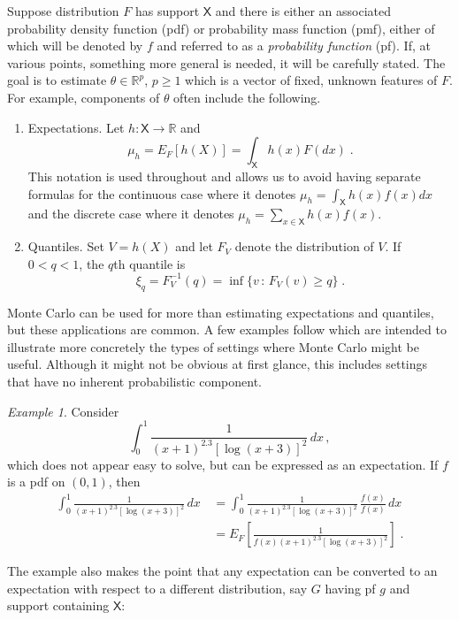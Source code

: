 \documentclass[12pt]{article}
\theoremstyle{plain}
\theoremstyle{definition}
\theoremstyle{remark}
\newtheorem{example}{Example}[section]
\newcommand{\sX}{\mathsf{X}}
\newcommand{\real}{\mathbb{R}}
\begin{document}
Suppose distribution $F$ has support $\sX$ and there is either an
associated probability density function (pdf) or probability mass
function (pmf), either of which will be denoted by $f$ and referred to
as a \textit{probability function} (pf).  If, at various points,
something more general is needed, it will be carefully stated.  The
goal is to estimate $\theta \in \mathbb{R}^p$, $p \ge 1$ which is a
vector of fixed, unknown features of $F$.  For example, components of
$\theta$ often include the following.
\begin{enumerate}
\item Expectations.  Let $h : \sX \to \real$ and 
\[
\mu_h = E_{F}[h(X)] = \int_{\sX} h(x) F(dx) \; .
\]
This notation is used throughout and allows us to avoid having
separate formulas for the continuous case where it denotes $\mu_{h} =
\int_{\sX} h(x) f(x) dx$ and the discrete case where it denotes
$\mu_{h} = \sum_{x \in \sX} h(x) f(x)$.

\item Quantiles.  Set $V=h(X)$ and let $F_V$ denote the distribution
  of $V$.  If $0 < q < 1$, the $q$th quantile is
\[
\xi_{q} = F_{V}^{-1}(q) = \inf \{ v \, : \, F_{V}(v) \ge q\} \; .
\]

\end{enumerate}
Monte Carlo can be used for more than estimating expectations and
quantiles, but these applications are common.  A few examples follow
which are intended to illustrate more concretely the types of
settings where Monte Carlo might be useful.  Although it might not be
obvious at first glance, this includes settings that have no inherent
probabilistic component.

\begin{example}
\label{gofmc:ex:integral}
Consider
\[
\int_{0}^{1} \frac{1}{(x+1)^{2.3} [\log ( x+3)]^{2}}\,  dx \, ,
\]
which does not appear easy to solve, but can be expressed as an
expectation.  If $f$ is a pdf on $(0,1)$, then
\begin{align*}
\int_{0}^{1} \frac{1}{(x+1)^{2.3} [\log ( x+3)]^{2}}\, dx \, & =
\int_{0}^{1} \frac{1}{(x+1)^{2.3} [\log ( x+3)]^{2}}\, \frac{f(x)}{f(x)} 
\, dx \\
& = E_{F}  \left[ \frac{1}{ f(x) (x+1)^{2.3} [\log ( x+3)]^{2}} \right]
\; .
\end{align*}
\end{example}

The example also makes the point that any expectation can be converted
to an expectation with respect to a different distribution, say $G$
having pf $g$ and support containing $\sX$:
\end{document}
